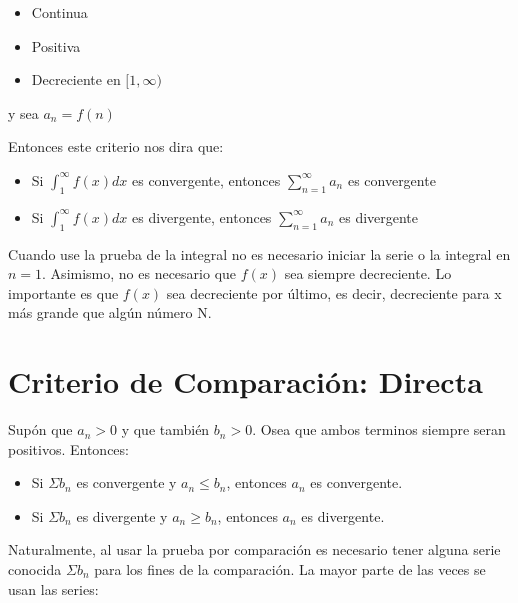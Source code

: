 \documentclass[12pt]{report}                                %
\begin{document}
        \begin{itemize}
            \item Continua
            \item Positiva
            \item Decreciente en $[1, \infty)$
        \end{itemize}

        y sea $a_n = f(n)$

        Entonces este criterio nos dira que:
        \begin{itemize}
           \item Si $\int_1^{\infty}f(x) dx$ es convergente, entonces $\sum_{n=1}^{\infty} a_n$ es convergente
           \item Si $\int_1^{\infty}f(x) dx$ es divergente, entonces $\sum_{n=1}^{\infty} a_n$ es divergente
        \end{itemize}

        Cuando use la prueba de la integral no es necesario iniciar la serie o la integral en $n=1$.
        Asimismo, no es necesario que $f(x)$ sea siempre decreciente.
        Lo importante es que $f(x)$ sea decreciente por último, es decir, decreciente para x más
        grande que algún número N. 



    \clearpage
    \section{Criterio de Comparación: Directa}

        Supón que $a _n > 0$ y que también $b_n > 0$. Osea que ambos terminos siempre seran positivos.
        Entonces:

        \begin{itemize}
            \item Si $\Sigma b_n$ es convergente y $a_n \leq b_n$, entonces $a_n$ es convergente. 
            \item Si $\Sigma b_n$ es divergente y $a_n \geq b_n$, entonces $a_n$ es divergente. 
        \end{itemize}

        Naturalmente, al usar la prueba por comparación es necesario tener alguna serie conocida $\Sigma b_n$
        para los fines de la comparación. La mayor parte de las veces se usan las series:
\end{document}
